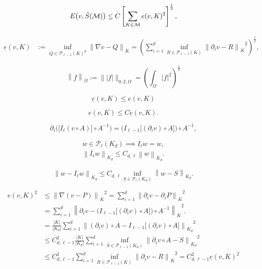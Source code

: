 \documentclass[a4paper]{article}
\begin{document}
\[
  E\big( v, \Tilde{S}({\mathcal{M}}) \big)
 \leq
 C  \left[
  \sum_{{K}\in{\mathcal{M}}} e(v,{K})^2
 \right]^{\frac12},
\]

\begin{align*}
 {\underline{e}}(v,{K})
 &{:=}
 \inf_{Q\in{\mathcal{P}_{{{\ell}-1}}({{K}})}^d} {\left\|{{\nabla} v-Q}\right\|_{K}}
 =
 \left( \sum_{i=1}^d
  \inf_{R\in{\mathcal{P}_{{{\ell}-1}}({{K}})}} {\left\|{\partial_i v - R}\right\|_{K}}^2
 \right)^{\frac12},
\end{align*}

\[
 {\left\|{f}\right\|_{{\Omega}}}
 {:=}
 \| |f| \|_{0,2;\Omega}
 =
 \left(
  \int_\Omega |f|^2
 \right)^{\frac12}
\]

\[
 {\underline{e}}(v,{K}) \leq e(v,{K})
\]

\[
  e(v,{K})
  \leq
  C {\underline{e}}(v,{K}).
\]

\begin{equation}\label{Diff-avgTaylor}
 \partial_i \Big( \big[ I_{\ell} (v\circ A) \big] \circ A^{-1} \Big)
 =
 \Big( I_{{\ell}-1} \big[ (\partial_i v) \circ A \big] \Big) \circ A^{-1},
\end{equation}

\begin{gather*}
 w\in{\mathcal{P}_{{\ell}}({{{{K}_d}}})} \implies I_{\ell} w = w,
\\
 {\left\|{I_{\ell} w}\right\|_{{{K}_d}}} \leq C_{d,{\ell}} {\left\|{w}\right\|_{{{K}_d}}}.
\end{gather*}

\begin{equation}\label{Ipdeg:nbest}
 {\left\|{w-I_{\ell} w}\right\|_{{{K}_d}}}
 \leq
 C_{d,{\ell}} \inf_{S\in{\mathcal{P}_{{\ell}}({{{{K}_d}}})}} {\left\|{w-S}\right\|_{{{K}_d}}}.
\end{equation}

\begin{align*}
 e(v,{K})^2
 &\leq
 {\left\|{{\nabla} (v - P)}\right\|_{K}}^2
 =
 \sum_{i=1}^d {\left\|{\partial_i v - \partial_i P}\right\|_{K}}^2
\\
 &=
 \sum_{i=1}^d 
  {\left\|{\partial_i v - \Big(
    I_{{\ell}-1} \big[ (\partial_i v) \circ A \big] 
    \Big) \circ A^{-1}}\right\|_{K}}^2.
\\
 &=
 \frac{{\left|{K}\right|}}{{\left|{{{K}_d}}\right|}} \sum_{i=1}^d 
  {\left\|{ (\partial_i v)\circ A - I_{{\ell}-1} \big[ (\partial_i v) \circ A 
   \big] }\right\|_{{{K}_d}}}^2
\\
 &\leq
 C_{d,{\ell}-1}^2 \frac{{\left|{K}\right|}}{{\left|{{{K}_d}}\right|}} \sum_{i=1}^d
  \inf_{S\in{\mathcal{P}_{{{\ell}-1}}({{{{K}_d}}})}}
   {\left\|{\partial_i v\circ A - S}\right\|_{{{K}_d}}}^2
\\
 &\leq
 C_{d,{\ell}-1}^2  \sum_{i=1}^d
  \inf_{R\in{\mathcal{P}_{{{\ell}-1}}({{K}})}}
   {\left\|{\partial_i v - R}\right\|_{K}}^2
 =
 C_{d,{\ell}-1}^2 {\underline{e}}(v,{K})^2
\end{align*}
\end{document}
